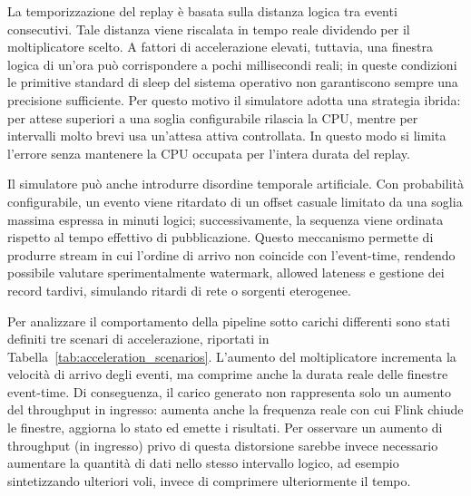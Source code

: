 \documentclass[conference]{IEEEtran}
\begin{document}
La temporizzazione del replay è basata sulla distanza logica tra eventi consecutivi. Tale distanza viene riscalata in tempo reale dividendo per il moltiplicatore scelto. A fattori di accelerazione elevati, tuttavia, una finestra logica di un'ora può corrispondere a pochi millisecondi reali; in queste condizioni le primitive standard di sleep del sistema operativo non garantiscono sempre una precisione sufficiente. Per questo motivo il simulatore adotta una strategia ibrida: per attese superiori a una soglia configurabile rilascia la CPU, mentre per intervalli molto brevi usa un'attesa attiva controllata. In questo modo si limita l'errore senza mantenere la CPU occupata per l'intera durata del replay.

Il simulatore può anche introdurre disordine temporale artificiale. Con probabilità configurabile, un evento viene ritardato di un offset casuale limitato da una soglia massima espressa in minuti logici; successivamente, la sequenza viene ordinata rispetto al tempo effettivo di pubblicazione. Questo meccanismo permette di produrre stream in cui l'ordine di arrivo non coincide con l'event-time, rendendo possibile valutare sperimentalmente watermark, allowed lateness e gestione dei record tardivi, simulando ritardi di rete o sorgenti eterogenee.

Per analizzare il comportamento della pipeline sotto carichi differenti sono stati definiti tre scenari di accelerazione, riportati in Tabella~\ref{tab:acceleration_scenarios}. L'aumento del moltiplicatore incrementa la velocità di arrivo degli eventi, ma comprime anche la durata reale delle finestre event-time. Di conseguenza, il carico generato non rappresenta solo un aumento del throughput in ingresso: aumenta anche la frequenza reale con cui Flink chiude le finestre, aggiorna lo stato ed emette i risultati. Per osservare un aumento di throughput (in ingresso) privo di questa distorsione sarebbe invece necessario aumentare la quantità di dati nello stesso intervallo logico, ad esempio sintetizzando ulteriori voli, invece di comprimere ulteriormente il tempo.
\end{document}
